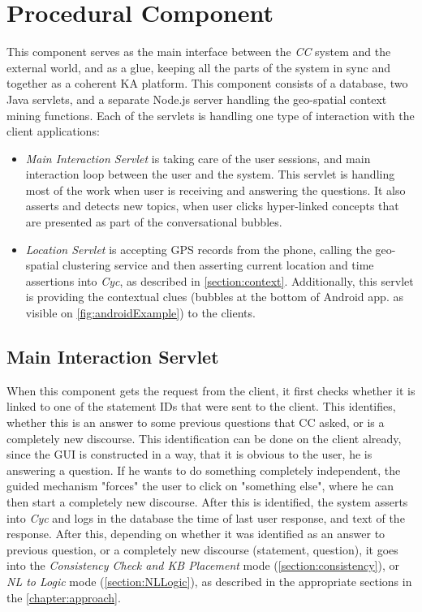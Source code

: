 \section{Procedural Component}
\label{section:prophet}
This component serves as the main interface between the \emph{CC} system and
the external world, and as a glue, keeping all the parts of the system in sync
and together as a coherent KA platform. This component consists of a database,
two Java servlets, and a separate Node.js server handling the geo-spatial 
context mining functions. Each of the servlets is handling one type of 
interaction with the client applications:
\begin{itemize}
\item \emph{Main Interaction Servlet} is taking care of the user sessions, and 
main interaction loop between the user and the system. This servlet is handling
most of the work when user is receiving and answering the questions. It also
asserts and detects new topics, when user clicks hyper-linked concepts that
are presented as part of the conversational bubbles.
\item \emph{Location Servlet} is accepting GPS records from the phone, calling
the geo-spatial clustering service and then asserting current location and 
time assertions into \emph{Cyc}, as described in \autoref{section:context}.
Additionally, this servlet is providing the contextual clues (bubbles at the
bottom of Android app. as visible on \autoref{fig:androidExample}) to the 
clients.
\end{itemize}

\subsection{Main Interaction Servlet}
\label{section:mainServlet}
When this component gets the request from the client, it first checks whether
it is linked to one of the statement IDs that were sent to the client. This
identifies, whether this is an answer to some previous questions that CC
asked, or is a completely new discourse. This identification can be done on 
the client already, since the GUI is constructed in a way, that it is obvious
to the user, he is answering a question. If he wants to do something completely
independent, the guided mechanism "forces" the user to click on 
"something else", where he can then start a completely new discourse.
After this is identified, the system asserts into  \emph{Cyc} and logs
in the database  the time of last user response, and text of the
response. After this, depending on whether it was identified as an answer to
previous question, or a completely new discourse (statement, question), it goes
into the \emph{Consistency Check and KB Placement} mode 
(\autoref{section:consistency}), or \emph{NL to Logic} mode 
(\autoref{section:NLLogic}), as described in the appropriate sections in the 
\autoref{chapter:approach}. 

